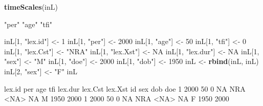 \documentclass[
]{book}
\newenvironment{Shaded}{\begin{snugshade}}{\end{snugshade}}
\newcommand{\ConstantTok}[1]{\textcolor[rgb]{0.56,0.35,0.01}{#1}}
\newcommand{\DecValTok}[1]{\textcolor[rgb]{0.00,0.00,0.81}{#1}}
\newcommand{\FunctionTok}[1]{\textcolor[rgb]{0.13,0.29,0.53}{\textbf{#1}}}
\newcommand{\NormalTok}[1]{#1}
\newcommand{\OtherTok}[1]{\textcolor[rgb]{0.56,0.35,0.01}{#1}}
\newcommand{\StringTok}[1]{\textcolor[rgb]{0.31,0.60,0.02}{#1}}
\begin{document}
\begin{enumerate}
\begin{Shaded}
\begin{Highlighting}[]
\FunctionTok{timeScales}\NormalTok{(inL)}
\end{Highlighting}
\end{Shaded}

\begin{Shaded}
\begin{Highlighting}[]
\NormalTok{[1] "per" "age" "tfi"}
\end{Highlighting}
\end{Shaded}

\begin{Shaded}
\begin{Highlighting}[]
\NormalTok{inL[}\DecValTok{1}\NormalTok{, }\StringTok{"lex.id"}\NormalTok{] }\OtherTok{\textless{}{-}} \DecValTok{1}
\NormalTok{inL[}\DecValTok{1}\NormalTok{, }\StringTok{"per"}\NormalTok{] }\OtherTok{\textless{}{-}} \DecValTok{2000}
\NormalTok{inL[}\DecValTok{1}\NormalTok{, }\StringTok{"age"}\NormalTok{] }\OtherTok{\textless{}{-}} \DecValTok{50}
\NormalTok{inL[}\DecValTok{1}\NormalTok{, }\StringTok{"tfi"}\NormalTok{] }\OtherTok{\textless{}{-}} \DecValTok{0}
\NormalTok{inL[}\DecValTok{1}\NormalTok{, }\StringTok{"lex.Cst"}\NormalTok{] }\OtherTok{\textless{}{-}} \StringTok{"NRA"}
\NormalTok{inL[}\DecValTok{1}\NormalTok{, }\StringTok{"lex.Xst"}\NormalTok{] }\OtherTok{\textless{}{-}} \ConstantTok{NA}
\NormalTok{inL[}\DecValTok{1}\NormalTok{, }\StringTok{"lex.dur"}\NormalTok{] }\OtherTok{\textless{}{-}} \ConstantTok{NA}
\NormalTok{inL[}\DecValTok{1}\NormalTok{, }\StringTok{"sex"}\NormalTok{] }\OtherTok{\textless{}{-}} \StringTok{"M"}
\NormalTok{inL[}\DecValTok{1}\NormalTok{, }\StringTok{"doe"}\NormalTok{] }\OtherTok{\textless{}{-}} \DecValTok{2000}
\NormalTok{inL[}\DecValTok{1}\NormalTok{, }\StringTok{"dob"}\NormalTok{] }\OtherTok{\textless{}{-}} \DecValTok{1950}
\NormalTok{inL }\OtherTok{\textless{}{-}} \FunctionTok{rbind}\NormalTok{(inL, inL)}
\NormalTok{inL[}\DecValTok{2}\NormalTok{, }\StringTok{"sex"}\NormalTok{] }\OtherTok{\textless{}{-}} \StringTok{"F"}
\NormalTok{inL}
\end{Highlighting}
\end{Shaded}

\begin{Shaded}
\begin{Highlighting}[]
\NormalTok{ lex.id  per age tfi lex.dur lex.Cst lex.Xst id sex  dob  doe}
\NormalTok{      1 2000  50   0      NA     NRA    \textless{}NA\textgreater{} NA   M 1950 2000}
\NormalTok{      1 2000  50   0      NA     NRA    \textless{}NA\textgreater{} NA   F 1950 2000}
\end{Highlighting}
\end{Shaded}


\end{enumerate}
\end{document}
